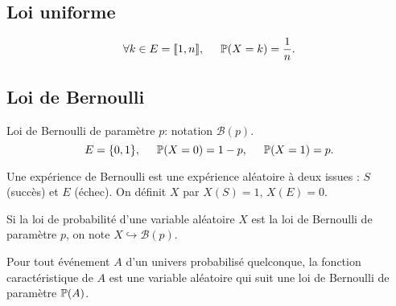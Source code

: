 \subsection{Loi uniforme}
\begin{defi}
\begin{displaymath}
\forall k \in E=\llbracket 1 , n\rrbracket, \hspace{0.5cm} \mathbb{P}(X=k) = \frac{1}{n}. 
\end{displaymath}  
\end{defi}

\subsection{Loi de Bernoulli}
\begin{defi}
Loi de Bernoulli de paramètre $p$: notation $\mathcal{B}(p)$.
\begin{displaymath}
E=\{0  , 1\}, \hspace{0.5cm} \mathbb{P}(X=0) = 1-p , \hspace{0.5cm} \mathbb{P}(X=1) = p  .
\end{displaymath}  
\end{defi}
Une expérience de Bernoulli est une expérience aléatoire à deux issues : $S$ (succès) et $E$ (échec). On définit $X$ par $X(S)=1$, $X(E)=0$.
\begin{nota}
Si la loi de probabilité d'une variable aléatoire $X$ est la loi de Bernoulli de paramètre $p$, on note $X\hookrightarrow \mathcal{B}(p)$.
\end{nota}
\begin{exple}
  Pour tout événement $A$ d'un univers probabilisé quelconque, la  fonction caractéristique de $A$ est une variable aléatoire qui suit une loi de Bernoulli de paramètre $\mathbb{P}(A)$.
\end{exple}

